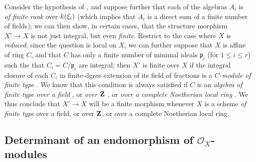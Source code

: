 \begin{remark}[6.3.10]
\label{II.6.3.10}
Consider the hypothesis of , and suppose further that each of the algebras $A_i$ is \emph{of finite rank} over $k(\xi_i)$ (which implies that $A_i$ is a direct sum of a finite number of fields);
we can then show, in certain cases, that the structure morphism $X'\to X$ is not just integral, but even \emph{finite}.
Restrict to the case where $X$ is \emph{reduced};
since the question is local on $X$, we can further suppose that $X$ is affine of ring $C$, and that $C$ has only a finite number of minimal ideals $\mathfrak{p}_i$ (for $1\leq i\leq r$) such the that $C_i=C/\mathfrak{p}_i$ are integral;
then $X'$ is finite over $X$ if the integral closure of each $C_i$ in finite-dgree extension of its field of fractions is a \emph{$C$-module of finite type} .
We know that this condition is always satisfied if $C$ is an \emph{algebra of finite type over a field} \cite[t.~I, p.~267, th.~9]{I-13}, or \emph{over $\mathbf{Z}$} \cite[I,p.~93, th.~3]{I-9}, or \emph{over a complete Noetherian local ring} \cite[p.~298]{II-25}.
We thus conclude that $X'\to X$ will be a finite morphism whenever $X$ is a scheme \emph{of finite type} over a field, or over $\mathbf{Z}$, or over a complete Noetherian local ring.
\end{remark}


\subsection{Determinant of an endomorphism of $\mathcal{O}_X$-modules}
\label{subsection:II.6.4}

